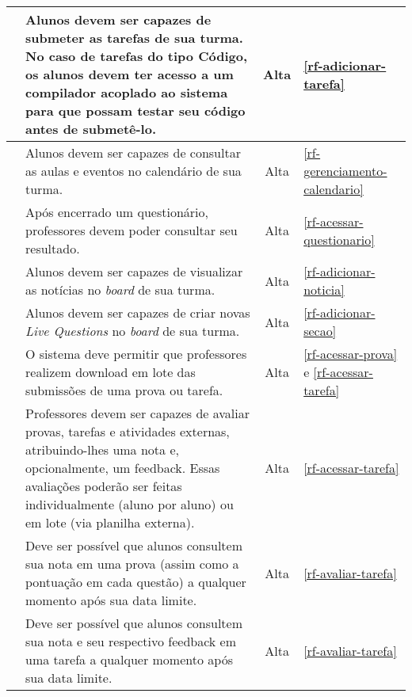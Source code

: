 \begin{longtable}{|c|p{10cm}|c|p{2cm}|}
	\RF\label{rf-acessar-tarefa}  &  Alunos devem ser capazes de submeter as tarefas de sua turma. No caso de tarefas do tipo Código, os alunos devem ter acesso a um compilador acoplado ao sistema para que possam testar seu código antes de submetê-lo. & Alta & \ref{rf-adicionar-tarefa} \\
	\hline

	\RF\label{rf-acessar-calendario}  &  Alunos devem ser capazes de consultar as aulas e eventos no calendário de sua turma. & Alta & \ref{rf-gerenciamento-calendario} \\
	\hline
	
	\RF\label{rf-resultado-questionario}  &  Após encerrado um questionário, professores devem poder consultar seu resultado. & Alta & \ref{rf-acessar-questionario} \\
	\hline
	
	\RF\label{rf-visualizar-noticia}  & Alunos devem ser capazes de visualizar as notícias no \textit{board} de sua turma. & 	Alta &  \ref{rf-adicionar-noticia} \\
	\hline 
	
	\RF\label{rf-adicionar-livequestion}  & Alunos devem ser capazes de criar novas \textit{Live Questions} no \textit{board} de sua turma. & 	Alta &  \ref{rf-adicionar-secao} \\
	\hline 
	  
	\RF\label{rf-download-lote}  & O sistema deve permitir que professores realizem download em lote das submissões de uma prova ou tarefa. & 	Alta &  \ref{rf-acessar-prova} e \ref{rf-acessar-tarefa} \\
	\hline
		
	\RF\label{rf-avaliar-tarefa} & Professores devem ser capazes de avaliar provas, tarefas e atividades externas, atribuindo-lhes uma nota e, opcionalmente, um feedback. Essas avaliações poderão ser feitas individualmente (aluno por aluno) ou em lote (via planilha externa).  & Alta & \ref{rf-acessar-tarefa} \\ \hline 
	
	\RF\label{rf-consultar-nota-prova} & Deve ser possível que alunos consultem sua nota em uma prova (assim como a pontuação em cada questão) a qualquer momento após sua data limite.  & Alta & \ref{rf-avaliar-tarefa} \\ \hline 
	
	\RF\label{rf-consultar-nota-tarefa} & Deve ser possível que alunos consultem sua nota e seu respectivo feedback em uma tarefa a qualquer momento após sua data limite.  & Alta & \ref{rf-avaliar-tarefa} \\ \hline 
	

\end{longtable}
